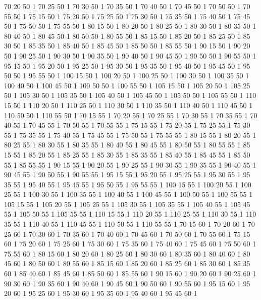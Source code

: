 	70	20	50	1
	70	25	50	1
	70	30	50	1
	70	35	50	1
	70	40	50	1
	70	45	50	1
	70	50	50	1
	70	55	50	1
	75	15	50	1
	75	20	50	1
	75	25	50	1
	75	30	50	1
	75	35	50	1
	75	40	50	1
	75	45	50	1
	75	50	50	1
	75	55	50	1
	80	15	50	1
	80	20	50	1
	80	25	50	1
	80	30	50	1
	80	35	50	1
	80	40	50	1
	80	45	50	1
	80	50	50	1
	80	55	50	1
	85	15	50	1
	85	20	50	1
	85	25	50	1
	85	30	50	1
	85	35	50	1
	85	40	50	1
	85	45	50	1
	85	50	50	1
	85	55	50	1
	90	15	50	1
	90	20	50	1
	90	25	50	1
	90	30	50	1
	90	35	50	1
	90	40	50	1
	90	45	50	1
	90	50	50	1
	90	55	50	1
	95	15	50	1
	95	20	50	1
	95	25	50	1
	95	30	50	1
	95	35	50	1
	95	40	50	1
	95	45	50	1
	95	50	50	1
	95	55	50	1
	100	15	50	1
	100	20	50	1
	100	25	50	1
	100	30	50	1
	100	35	50	1
	100	40	50	1
	100	45	50	1
	100	50	50	1
	100	55	50	1
	105	15	50	1
	105	20	50	1
	105	25	50	1
	105	30	50	1
	105	35	50	1
	105	40	50	1
	105	45	50	1
	105	50	50	1
	105	55	50	1
	110	15	50	1
	110	20	50	1
	110	25	50	1
	110	30	50	1
	110	35	50	1
	110	40	50	1
	110	45	50	1
	110	50	50	1
	110	55	50	1
	70	15	55	1
	70	20	55	1
	70	25	55	1
	70	30	55	1
	70	35	55	1
	70	40	55	1
	70	45	55	1
	70	50	55	1
	70	55	55	1
	75	15	55	1
	75	20	55	1
	75	25	55	1
	75	30	55	1
	75	35	55	1
	75	40	55	1
	75	45	55	1
	75	50	55	1
	75	55	55	1
	80	15	55	1
	80	20	55	1
	80	25	55	1
	80	30	55	1
	80	35	55	1
	80	40	55	1
	80	45	55	1
	80	50	55	1
	80	55	55	1
	85	15	55	1
	85	20	55	1
	85	25	55	1
	85	30	55	1
	85	35	55	1
	85	40	55	1
	85	45	55	1
	85	50	55	1
	85	55	55	1
	90	15	55	1
	90	20	55	1
	90	25	55	1
	90	30	55	1
	90	35	55	1
	90	40	55	1
	90	45	55	1
	90	50	55	1
	90	55	55	1
	95	15	55	1
	95	20	55	1
	95	25	55	1
	95	30	55	1
	95	35	55	1
	95	40	55	1
	95	45	55	1
	95	50	55	1
	95	55	55	1
	100	15	55	1
	100	20	55	1
	100	25	55	1
	100	30	55	1
	100	35	55	1
	100	40	55	1
	100	45	55	1
	100	50	55	1
	100	55	55	1
	105	15	55	1
	105	20	55	1
	105	25	55	1
	105	30	55	1
	105	35	55	1
	105	40	55	1
	105	45	55	1
	105	50	55	1
	105	55	55	1
	110	15	55	1
	110	20	55	1
	110	25	55	1
	110	30	55	1
	110	35	55	1
	110	40	55	1
	110	45	55	1
	110	50	55	1
	110	55	55	1
	70	15	60	1
	70	20	60	1
	70	25	60	1
	70	30	60	1
	70	35	60	1
	70	40	60	1
	70	45	60	1
	70	50	60	1
	70	55	60	1
	75	15	60	1
	75	20	60	1
	75	25	60	1
	75	30	60	1
	75	35	60	1
	75	40	60	1
	75	45	60	1
	75	50	60	1
	75	55	60	1
	80	15	60	1
	80	20	60	1
	80	25	60	1
	80	30	60	1
	80	35	60	1
	80	40	60	1
	80	45	60	1
	80	50	60	1
	80	55	60	1
	85	15	60	1
	85	20	60	1
	85	25	60	1
	85	30	60	1
	85	35	60	1
	85	40	60	1
	85	45	60	1
	85	50	60	1
	85	55	60	1
	90	15	60	1
	90	20	60	1
	90	25	60	1
	90	30	60	1
	90	35	60	1
	90	40	60	1
	90	45	60	1
	90	50	60	1
	90	55	60	1
	95	15	60	1
	95	20	60	1
	95	25	60	1
	95	30	60	1
	95	35	60	1
	95	40	60	1
	95	45	60	1
